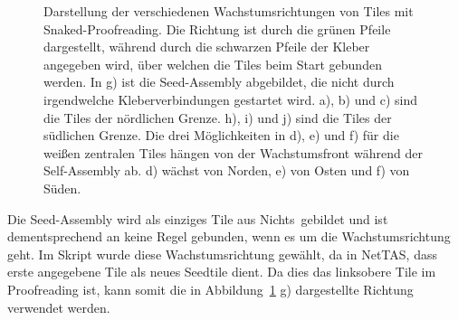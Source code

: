 \begin{figure}
    \caption[Wachstumrichtung für Tiles mit Snaked-Proofreading je nach Farbcode]{Darstellung der verschiedenen Wachstumsrichtungen von Tiles mit Snaked-Proofreading. Die Richtung ist durch die grünen Pfeile dargestellt, während durch die schwarzen Pfeile der Kleber angegeben wird, über welchen die Tiles beim Start gebunden werden. In g) ist die Seed-Assembly abgebildet, die nicht durch irgendwelche Kleberverbindungen gestartet wird. a), b) und c) sind die Tiles der nördlichen Grenze. h), i) und j) sind die Tiles der südlichen Grenze. Die drei Möglichkeiten in d), e) und f) für die weißen zentralen Tiles hängen von der Wachstumsfront während der Self-Assembly ab. d) wächst von Norden, e) von Osten und f) von Süden.}
    \label{fig:snaked_wachstum}
\end{figure}

Die Seed-Assembly wird als einziges Tile aus \glqq Nichts\grqq\, gebildet und ist dementsprechend an keine Regel gebunden, wenn es um die Wachstumsrichtung geht. Im Skript wurde diese Wachstumsrichtung gewählt, da in NetTAS, dass erste angegebene Tile als neues Seedtile dient. Da dies das linksobere Tile im Proofreading ist, kann somit die in Abbildung~\ref{fig:snaked_wachstum} g) dargestellte Richtung verwendet werden. 

